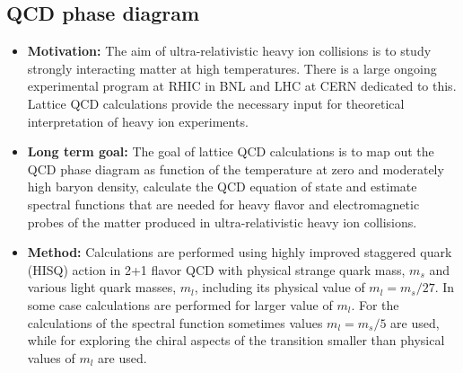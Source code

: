 \documentclass[12pt,hyperpdf]{article}
\begin{document}
\subsection{QCD phase diagram}\label{sec:qcdphase}
\begin{itemize}
  \item{\bf Motivation:} The aim of ultra-relativistic heavy ion
    collisions is to study strongly interacting matter at high
    temperatures. There is a large ongoing experimental program at
    RHIC in BNL and LHC at CERN dedicated to this. Lattice QCD
    calculations provide the necessary input for theoretical
    interpretation of heavy ion experiments. 

 \item{\bf Long term goal:} The goal of lattice QCD calculations is to
      map out the QCD phase diagram as function of the temperature at
      zero and moderately high baryon density, calculate the QCD
      equation of state and estimate spectral functions that are
      needed for heavy flavor and electromagnetic probes of the matter
      produced in ultra-relativistic heavy ion
      collisions. \item{\bf Method:} Calculations are performed using
      highly improved staggered quark (HISQ) action in 2+1 flavor QCD
      with physical strange quark mass, $m_s$ and various light quark
      masses, $m_l$,  including its physical value of $m_l=m_s/27$. In
      some case calculations are performed for larger value of
      $m_l$. For the calculations of the spectral function sometimes
      values $m_l=m_s/5$ are used, while for exploring the chiral
      aspects of the transition smaller than physical values of $m_l$
      are used. 


\end{itemize}
\end{document}
